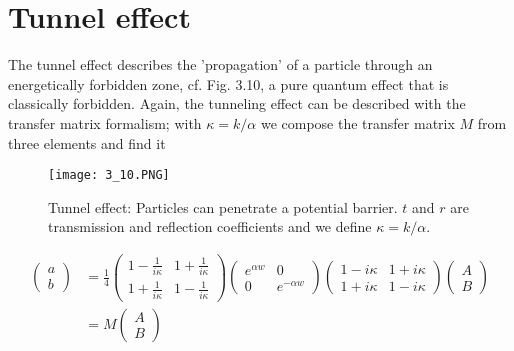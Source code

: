 \section{Tunnel effect}
The tunnel effect describes the 'propagation' of a particle through an energetically forbidden zone, cf. Fig. 3.10, a pure quantum effect that is classically forbidden. Again, the tunneling effect can be described with the transfer matrix formalism; with $\kappa = k / \alpha$ we compose the transfer matrix $M$ from three elements and find it
\begin{figure}[ht]
    \begin{minipage}{0.5\textwidth}
        \centering
        \texttt{[image: 3\_10.PNG]}
    \end{minipage}
    \begin{minipage}{0.5\textwidth}
        \caption{Tunnel effect: Particles can penetrate a potential barrier. $t$ and $r$ are transmission and reflection coefficients and we define $\kappa = k / \alpha$.}
    \end{minipage}
\end{figure}
\begin{equation}
    \begin{split}
    \left(\begin{array}{l}{a} \\ {b}\end{array}\right)&=\frac{1}{4}\left(\begin{array}{cc}{1-\frac{1}{i \kappa}} & {1+\frac{1}{i \kappa}} \\ {1+\frac{1}{i \kappa}} & {1-\frac{1}{i \kappa}}\end{array}\right)\left(\begin{array}{cc}{e^{\alpha w}} & {0} \\ {0} & {e^{-\alpha w}}\end{array}\right)\left(\begin{array}{cc}{1-i \kappa} & {1+i \kappa} \\ {1+i \kappa} & {1-i \kappa}\end{array}\right)\left(\begin{array}{c}{A} \\ {B}\end{array}\right)\\
    &=M\left(\begin{array}{c}
        {A}\\{B}
    \end{array}\right)\\
    \end{split}
\end{equation}
